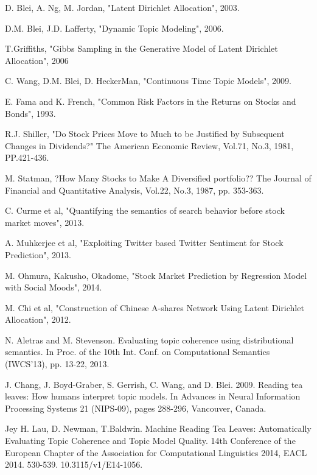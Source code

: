 \documentclass[12pt,journal,letterpaper,oneside,onecolumn]{IEEEtran}
\begin{document}
\begin{thebibliography}{1}
	 D. Blei, A. Ng, M. Jordan,  "Latent Dirichlet Allocation", 2003.
	
	 D.M. Blei, J.D. Lafferty, "Dynamic Topic Modeling", 2006.
	
	 T.Griffiths, "Gibbs Sampling in the Generative Model of Latent 
	Dirichlet Allocation", 2006
	
	C. Wang, D.M. Blei, D. HeckerMan, "Continuous Time Topic Models",
	2009.
	
	 E. Fama and K. French, "Common Risk Factors in the Returns on Stocks and Bonds", 1993.
	
	 R.J. Shiller, "Do Stock Prices Move to Much to be Justified by Subsequent Changes in Dividends?" The American Economic Review, Vol.71, No.3, 1981, PP.421-436.
	
	 M. Statman, ?How Many Stocks to Make A Diversified portfolio?? The Journal of Financial and Quantitative Analysis, Vol.22, No.3, 1987, pp. 353-363.
	
	 C. Curme et al, "Quantifying the semantics of search behavior before stock market moves", 2013.
	
	 A. Muhkerjee et al, "Exploiting Twitter based Twitter Sentiment for Stock Prediction", 2013.
	
	 M. Ohmura, Kakusho, Okadome, "Stock Market Prediction by Regression Model with Social Moods", 2014.
	
	 M. Chi et al, "Construction of Chinese A-shares Network Using Latent Dirichlet Allocation", 2012.
    
    N. Aletras and M. Stevenson. Evaluating topic coherence using distributional semantics. In Proc. of the 10th Int. Conf. on Computational Semantics (IWCS’13), pp. 13-22, 2013.
    
    J. Chang, J. Boyd-Graber, S. Gerrish, C. Wang, and D. Blei. 2009. Reading tea leaves: How humans interpret topic models. In Advances in Neural Information Processing Systems 21 (NIPS-09), pages 288-296, Vancouver, Canada.
    
    Jey H. Lau, D. Newman, T.Baldwin. Machine Reading Tea Leaves: Automatically Evaluating Topic Coherence and Topic Model Quality. 14th Conference of the European Chapter of the Association for Computational Linguistics 2014, EACL 2014. 530-539. 10.3115/v1/E14-1056. 
    

\end{thebibliography}
\end{document}
